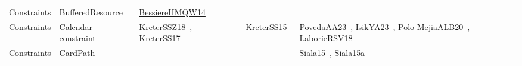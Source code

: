 {\begin{longtable}{lp{3cm}>{\raggedright\arraybackslash}p{6cm}>{\raggedright\arraybackslash}p{6cm}>{\raggedright\arraybackslash}p{8cm}}
Constraints & BufferedResource & \href{../works/BessiereHMQW14.pdf}{BessiereHMQW14}~\cite{BessiereHMQW14} &  & \\
Constraints & Calendar constraint & \href{../works/KreterSSZ18.pdf}{KreterSSZ18}~\cite{KreterSSZ18}, \href{../works/KreterSS17.pdf}{KreterSS17}~\cite{KreterSS17} & \href{../works/KreterSS15.pdf}{KreterSS15}~\cite{KreterSS15} & \href{../works/PovedaAA23.pdf}{PovedaAA23}~\cite{PovedaAA23}, \href{../works/IsikYA23.pdf}{IsikYA23}~\cite{IsikYA23}, \href{../works/Polo-MejiaALB20.pdf}{Polo-MejiaALB20}~\cite{Polo-MejiaALB20}, \href{../works/LaborieRSV18.pdf}{LaborieRSV18}~\cite{LaborieRSV18}\\
Constraints & CardPath &  &  & \href{../works/Siala15.pdf}{Siala15}~\cite{Siala15}, \href{../works/Siala15a.pdf}{Siala15a}~\cite{Siala15a}\\

\end{longtable}}
